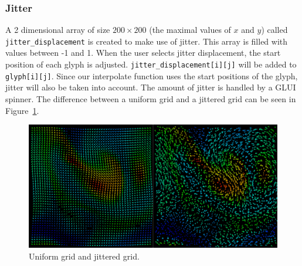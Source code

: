 		\subsubsection{Jitter}
			A 2 dimensional array of size $200 \times 200$ (the maximal values of $x$ and $y$) called \texttt{jitter\_displacement} is created to make use of jitter.
			This array is filled with values between -1 and 1.
			When the user selects jitter displacement, the start position of each glyph is adjusted.
			\texttt{jitter\_displacement[i][j]} will be added to \texttt{glyph[i][j]}.
			Since our interpolate function uses the start positions of the glyph, jitter will also be taken into account.
			The amount of jitter is handled by a GLUI spinner.
			The difference between a uniform grid and a jittered grid can be seen in Figure~\ref{fig:jitter}.
		\begin{figure}[htb]
			  \centering
			  \includegraphics[width=\linewidth]{./content/pictures/jitter.png}
			  \caption{Uniform grid and jittered grid.}
			  \label{fig:jitter}
		\end{figure}


